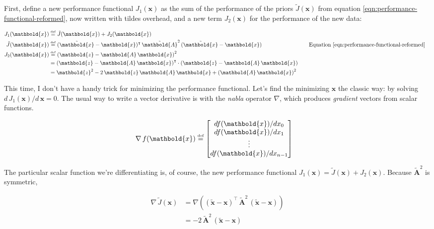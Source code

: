 \documentclass[10pt,oneside,x11names]{article}
\begin{document}
First, define a new performance functional \(J_1(\mathbold{x})\) as the sum of the 
performance of the priors \(\tilde{J}(\mathbold{x})\) from equation
\ref{eqn:performance-functional-reformed}, now written with tildes overhead,
and a new term
\(J_2(\mathbold{x})\) for the
performance of the new data:

\begin{alignat}{6}
J_1(\mathbold{x})
& \stackrel{\text{\tiny def}}{=}
{\tilde{J}}(\mathbold{x}) +
J_2(\mathbold{x})
\\
\notag
{\tilde{J}}(\mathbold{x})
&\stackrel{\text{\tiny def}}{=}
(\tilde{\mathbold{x}}-\mathbold{x})^\intercal\,
{\tilde{\mathbold{A}}^2}\,
(\tilde{\mathbold{x}}-\mathbold{x})
&&
\quad\text{Equation \ref{eqn:performance-functional-reformed}}
\\
\label{eqn:performance-of-new-data}
J_2(\mathbold{x})
&\stackrel{\text{\tiny def}}{=}
\left(
\mathbold{z}-
\mathbold{A}\,
\mathbold{x}
\right)^2
\\
\notag
&=
\left(
\mathbold{z}-
\mathbold{A}\,
\mathbold{x}
\right)^\intercal
\cdot
\left(
\mathbold{z}-
\mathbold{A}\,
\mathbold{x}
\right)
\\
\notag
&=
\mathbold{z}^2 -
2\,
\mathbold{z}\,
\mathbold{A}\,
\mathbold{x} +
\left(
\mathbold{A}\,
\mathbold{x}
\right)^2
\end{alignat}

This time, I don't have a handy trick for minimizing the performance functional.
Let's find the minimizing \(\mathbold{x}\) the classic way: by solving
\(d\,J_1(\mathbold{x})/d\,\mathbold{x}=0\). The usual way to write a vector
derivative is with the \emph{nabla} operator \(\nabla\), which produces \emph{gradient}
vectors from scalar functions.

\begin{align*}
\nabla{}\,f(\mathbold{x}) &\stackrel{\text{\tiny def}}{=}
\begin{bmatrix}
df(\mathbold{x})/dx_0\\
df(\mathbold{x})/dx_1\\
\vdots\\
df(\mathbold{x})/dx_{n-1}
\end{bmatrix}
\end{align*}

The particular scalar function we're differentiating is, of course, the new
performance functional
\(J_1(\mathbold{x})=
{\tilde{J}}(\mathbold{x})+
J_2(\mathbold{x})\). Because
\({\tilde{\mathbold{A}}^2}\) is symmetric,

\begin{align*}
\nabla{}\,
{\tilde{J}}(\mathbold{x}) &=
\nabla{}
\left(
(\tilde{\mathbold{x}}-\mathbold{x})^\intercal\,
{\tilde{\mathbold{A}}^2}\,
(\tilde{\mathbold{x}}-\mathbold{x})
\right) \\ &=
-2\,
{\tilde{\mathbold{A}}^2}\,
(\tilde{\mathbold{x}}-\mathbold{x})
\end{align*}
\end{document}

